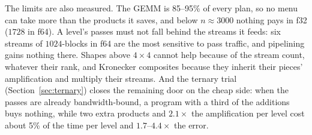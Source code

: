 \documentclass[11pt]{article}
\begin{document}
The limits are also measured.  The GEMM is 85--95\% of every plan, so no menu
can take more than the products it saves, and below $n\approx3000$ nothing
pays in f32 ($1728$ in f64).  A level's passes must not fall behind the
streams it feeds: six streams of $1024$-blocks in f64 are the most sensitive
to pass traffic, and pipelining gains nothing there.  Shapes above
$4\times4$ cannot help because of the stream count, whatever their rank, and
Kronecker composites because they inherit their pieces' amplification and
multiply their streams.  And the ternary trial (Section~\ref{sec:ternary})
closes the remaining door on the cheap side: when the passes are already
bandwidth-bound, a program with a third of the additions buys nothing, while
two extra products and $2.1\times$ the amplification per level cost about 5\% of the
time per level and $1.7$--$4.4\times$ the error.
\end{document}
